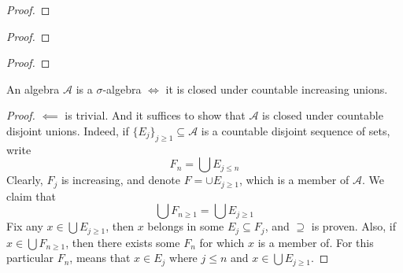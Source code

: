 \documentclass[../../main.tex]{subfiles}
\begin{document}
\fexercisesHeader

\begin{wts}
    
\end{wts}
\begin{proof}
    
\end{proof}
\newpage


\begin{wts}
    
\end{wts}
\begin{proof}
    
\end{proof}
\newpage

\begin{wts}
    
\end{wts}
\begin{proof}
    
\end{proof}
\newpage


\begin{wts}
    An algebra $\mathcal{A}$ is a $\sigma$-algebra $\iff$ it is closed under countable increasing unions.
\end{wts}
\begin{proof}
    $\impliedby$ is trivial. And it suffices to show that $\mathcal{A}$ is closed under countable disjoint unions. Indeed, if $\{E_j\}_{j\geq 1}\subseteq \mathcal{A}$ is a countable disjoint sequence of sets, write
    \[
    F_n=\bigcup E_{j\leq n}
    \]
    Clearly, $F_j$ is increasing, and denote $F=\cup E_{j\geq 1}$, which is a member of $\mathcal{A}$. We claim that
    \[
    \bigcup F_{n\geq 1}=\bigcup E_{j\geq 1}
    \]
    Fix any $x\in\bigcup E_{j\geq 1}$, then $x$ belongs in some $E_j\subseteq F_j$, and $\supseteq$ is proven. Also, if $x\in\bigcup F_{n\geq 1}$, then there exists some $F_n$ for which $x$ is a member of. For this particular $F_n$, means that $x\in E_j$ where $j\leq n$ and $x\in \bigcup E_{j\geq 1}$.
\end{proof}
\newpage
\end{document}
